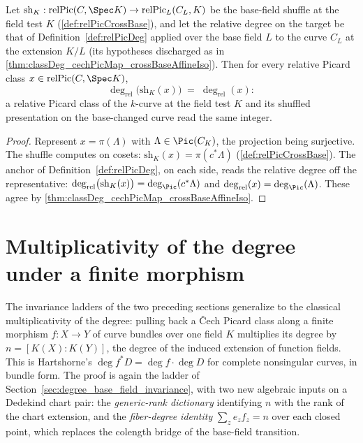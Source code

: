 \begin{theorem}
  \label{thm:relPicDeg_relPicCrossBase}
  \leanok
  Let \(\mathrm{sh}_K : \mathrm{relPic}(C, \Spec K) \to \mathrm{relPic}_L(C_L, K)\)
  be the base-field shuffle at the field test \(K\) (\ref{def:relPicCrossBase}), and
  let the relative degree on the target be that of Definition~\ref{def:relPicDeg}
  applied over the base field \(L\) to the curve \(C_L\) at the extension \(K/L\)
  (its hypotheses discharged as in
  \ref{thm:classDeg_cechPicMap_crossBaseAffineIso}). Then for every relative Picard
  class \(x \in \mathrm{relPic}(C, \Spec K)\),
  \[
    \deg_{\mathrm{rel}}\bigl(\mathrm{sh}_K(x)\bigr) \;=\; \deg_{\mathrm{rel}}(x) :
  \]
  a relative Picard class of the \(k\)-curve at the field test \(K\) and its shuffled
  presentation on the base-changed curve read the same integer.
\end{theorem}
\begin{proof}
  \leanok
  Represent \(x = \pi(\Lambda)\) with \(\Lambda \in \Pic(C_K)\), the projection being
  surjective. The shuffle computes on cosets:
  \(\mathrm{sh}_K(x) = \pi(c^{*}\Lambda)\) (\ref{def:relPicCrossBase}). The anchor of
  Definition~\ref{def:relPicDeg}, on each side, reads the relative degree off the
  representative:
  \(\deg_{\mathrm{rel}}\bigl(\mathrm{sh}_K(x)\bigr) = \deg_{\Pic}(c^{*}\Lambda)\) and
  \(\deg_{\mathrm{rel}}(x) = \deg_{\Pic}(\Lambda)\). These agree by
  \ref{thm:classDeg_cechPicMap_crossBaseAffineIso}.
\end{proof}

\section{Multiplicativity of the degree under a finite morphism}
\label{sec:degree_pullback}

The invariance ladders of the two preceding sections generalize to the classical
multiplicativity of the degree: pulling back a \v Cech Picard class along a finite
morphism \(f : X \to Y\) of curve bundles over one field \(K\) multiplies its degree by
\(n = [K(X) : K(Y)]\), the degree of the induced extension of function fields. This is
Hartshorne's \(\deg f^{*}D = \deg f \cdot \deg D\) for complete nonsingular curves, in
bundle form. The proof is again the ladder of
Section~\ref{sec:degree_base_field_invariance}, with two new algebraic inputs on a
Dedekind chart pair: the \emph{generic-rank dictionary} identifying \(n\) with the rank
of the chart extension, and the \emph{fiber-degree identity}
\(\sum_z e_z f_z = n\) over each closed point, which replaces the colength bridge of the
base-field transition.

